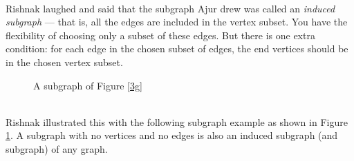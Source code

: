 \\
\noindent
Rishnak laughed and said that the subgraph Ajur drew was called an \textit {induced subgraph} --- that is, all the edges are included in the vertex subset. You have the flexibility of choosing only a subset of these edges. But there is one extra condition: for each edge in the chosen subset of edges, the end vertices should be in the chosen vertex subset. 
\\
\begin{figure}
\begin{center}
\caption{A subgraph of Figure \ref{3g}}\label{3g2}
\end{center}
\end{figure}
\\
\noindent
Rishnak illustrated this with the following subgraph example as shown in Figure \ref{3g2}. A subgraph with no vertices and no edges is also an induced subgraph (and subgraph) of any graph.



